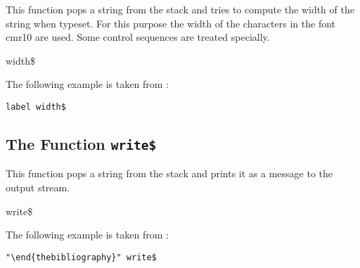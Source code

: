 This function pops a string from the stack and tries to compute the
width of the string when typeset. For this purpose the width of the
characters in the font cmr10 are used. Some control sequences are
treated specially.

\begin{BstFunction}{width\$}
\end{BstFunction}

The following example is taken from :

\begin{lstlisting}[language=bst]
  label width$
\end{lstlisting}


\subsection{The Function \texttt{write\$}}%

This function pops a string from the stack and prints it as a
message to the output stream.

\begin{BstFunction}{write\$}
\end{BstFunction}

The following example is taken from :

\begin{lstlisting}[language=bst]
  "\end{thebibliography}" write$
\end{lstlisting}

%
\endinput
%
